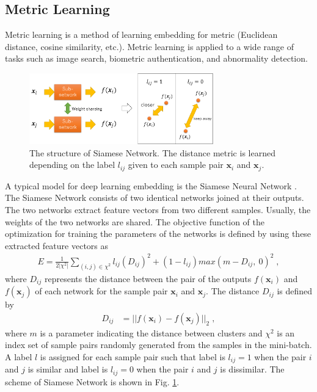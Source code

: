 \documentclass[a4paper,12pt]{article}
\begin{document}
\subsection{Metric Learning}
Metric learning is a method of learning embedding for metric (Euclidean distance, cosine similarity, etc.).
Metric learning is applied to a wide range of tasks such as image search, biometric authentication, and abnormality detection.

\begin{figure}[ht]
\begin{center}
\includegraphics[width=80mm]{figure_siamese.png}
\caption{The structure of Siamese Network. The distance metric is learned depending on the label $l_{ij}$ given to each sample pair $\bm{x}_i$ and $\bm{x}_j$.}
\label{fig:siamese}
\end{center}
\end{figure}

A typical model for deep learning embedding is the Siamese Neural Network \cite{Bromely1994,Chopra2005,Hadsell2006}.
The Siamese Network consists of two identical networks joined at their outputs.
The two networks extract feature vectors from two different samples.
Usually, the weights of the two networks are shared.
The objective function of the optimization for training the parameters of the networks is defined by using these extracted feature vectors as
\begin{align} \label{eq:contrastive}
E=\frac{1}{2|\chi^2|}\sum_{(i,j) \in \chi^2} l_{ij}(D_{ij})^2 + (1-l_{ij})max(m-D_{ij}, ~0)^2 \; ,
\end{align}
where $D_{ij}$ represents the distance between the pair of the outputs $f(\bm{x}_i)$ and $f(\bm{x}_j)$ of each network for the sample pair $\bm{x}_i$ and $\bm{x}_j$.
The distance $D_{ij}$ is defined by
\begin{align} 
D_{ij}&=||f({\bm x}_{i})-f({\bm x}_{j})||_2 \; ,
\label{eq:dis}
\end{align}
where $m$ is a parameter indicating the distance between clusters and 
$\chi^2$ is an index set of sample pairs randomly generated from the samples in the mini-batch.
A label $l$ is assigned for each sample pair such that 
label is $l_{ij}=1$ when the pair $i$ and $j$ is similar and label is $l_{ij}=0$ when the pair $i$ and $j$ is dissimilar.
The scheme of Siamese Network is shown in Fig. \ref{fig:siamese}.
\end{document}
